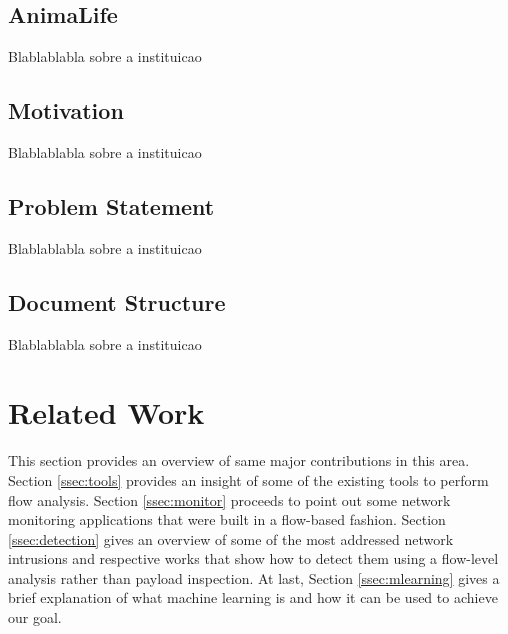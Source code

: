 \documentclass[runningheads,a4paper]{llncs}
\begin{document}
\subsection{AnimaLife}\label{sec:related}
Blablablabla sobre a instituicao

\subsection{Motivation}\label{sec:related}
Blablablabla sobre a instituicao

\subsection{Problem Statement}\label{sec:related}
Blablablabla sobre a instituicao


\subsection{Document Structure}\label{sec:related}
Blablablabla sobre a instituicao

\section{Related Work}\label{sec:related}

This section provides an overview of same major contributions in this area. Section \ref{ssec:tools} provides an insight of some of the existing tools to perform flow analysis. Section \ref{ssec:monitor} proceeds to point out some network monitoring applications that were built in a flow-based fashion. Section \ref{ssec:detection} gives an overview of some of the most addressed network intrusions and respective works that show how to detect them using a flow-level analysis rather than payload inspection. At last, Section \ref{ssec:mlearning} gives a brief explanation of what machine learning is and how it can be used to achieve our goal. 
\end{document}

